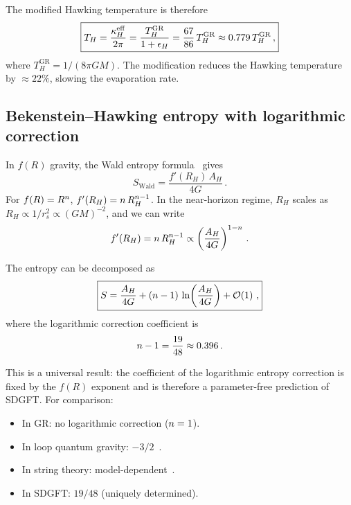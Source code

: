 \documentclass[amsmath,amssymb,aps,prd,twocolumn,superscriptaddress,nofootinbib]{revtex4-2}
\begin{document}
The modified Hawking temperature is therefore
\begin{equation}
  \boxed{%
    T_H = \frac{\kappa_H^{\mathrm{eff}}}{2\pi}
        = \frac{T_H^{\mathrm{GR}}}{1 + \epsilon_H}
        = \frac{67}{86}\,T_H^{\mathrm{GR}}
        \approx 0.779\,T_H^{\mathrm{GR}}\,,
  }
  \label{eq:T_Hawking}
\end{equation}
where $T_H^{\mathrm{GR}} = 1/(8\pi GM)$.  The modification
reduces the Hawking temperature by $\approx 22\%$, slowing
the evaporation rate.

\subsection{Bekenstein--Hawking entropy with logarithmic correction}

In $f(R)$ gravity, the Wald entropy formula~\cite{Wald1993,
Jacobson1994} gives
\begin{equation}
  S_{\mathrm{Wald}} = \frac{f'(R_H)\,A_H}{4G}\,.
  \label{eq:Wald_entropy}
\end{equation}
For $f(R) = R^{n}$, $f'(R_H) = n\,R_H^{n-1}$.
In the near-horizon regime, $R_H$ scales as $R_H \propto
1/r_s^2 \propto (G M)^{-2}$, and we can write
\begin{equation}
  f'(R_H) = n\,R_H^{n-1}
           \propto \left(\frac{A_H}{4G}\right)^{1-n}\,.
  \label{eq:fp_scaling}
\end{equation}

The entropy can be decomposed as~\cite{Cognola2011,Nojiri2017}
\begin{equation}
  \boxed{%
    S = \frac{A_H}{4G}
      + (\nfR - 1)\,\ln\!\left(\frac{A_H}{4G}\right)
      + \order{1}\,,
  }
  \label{eq:entropy}
\end{equation}
where the logarithmic correction coefficient is
\begin{equation}
  n - 1 = \frac{19}{48} \approx 0.396\,.
  \label{eq:log_coeff}
\end{equation}

This is a universal result: the coefficient of the logarithmic
entropy correction is fixed by the $f(R)$ exponent and is therefore
a parameter-free prediction of SDGFT.  For comparison:
\begin{itemize}
  \item In GR: no logarithmic correction ($n = 1$).
  \item In loop quantum gravity: $-3/2$~\cite{Kaul2000}.
  \item In string theory: model-dependent~\cite{Sen2012}.
  \item In SDGFT: $19/48$ (uniquely determined).
\end{itemize}
\end{document}
